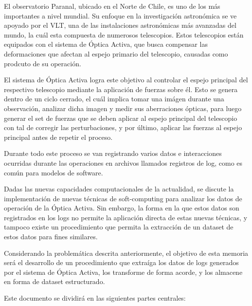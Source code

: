 
El observatorio Paranal, ubicado en el Norte de Chile, es uno de los más importantes a nivel mundial. Su enfoque en la investigación astronómica se ve apoyado por el VLT, una de las instalaciones astronómicas más avanzadas del mundo, la cuál esta compuesta de numerosos telescopios. Estos telescopios están equipados con el sistema de Óptica Activa, que busca compensar las deformaciones que afectan al espejo primario del telescopio, causadas como prodcuto de su operación.

El sistema de Óptica Activa logra este objetivo al controlar el espejo principal del respectivo telescopio mediante la aplicación de fuerzas sobre él. Esto se genera dentro de un ciclo cerrado, el cuál implica tomar una imágen durante una observación, analizar dicha imagen y medir sus aberraciones ópticas, para luego generar el set de fuerzas que se deben aplicar al espejo principal del telescopio con tal de corregir las perturbaciones, y por último, aplicar las fuerzas al espejo principal antes de repetir el proceso.

Durante todo este proceso se van registrando varios datos e interacciones ocurridas durante las operaciones en archivos llamados registros de log, como es común para modelos de software.

Dadas las nuevas capacidades computacionales de la actualidad, se discute la implementación de nuevas técnicas de soft-computing para analizar los datos de operación de la Óptica Activa. Sin embargo, la forma en la que estos datos son registrados en los logs no permite la aplicación directa de estas nuevas técnicas, y tampoco existe un procedimiento que permita la extracción de un dataset de estos datos para fines similares.

Considerando la problemática descrita anteriormente, el objetivo de esta memoria será el desarrollo de un procedimiento que extraíga los datos de logs generados por el sistema de Óptica Activa, los transforme de forma acorde, y los almacene en forma de dataset estructurado.

Este documento se dividirá en las siguientes partes centrales:

